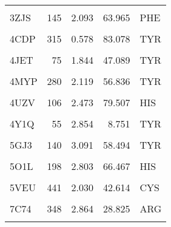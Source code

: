 \begin{table}
{\begin{tabular}{lrrrl}
				\cellcolor{gray!6}{3VP5} & \cellcolor{gray!6}{149} & \cellcolor{gray!6}{2.237} & \cellcolor{gray!6}{49.264} & \cellcolor{gray!6}{HIS}\\
				3ZJS & 145 & 2.093 & 63.965 & PHE\\
				\cellcolor{gray!6}{4B8N} & \cellcolor{gray!6}{71} & \cellcolor{gray!6}{1.755} & \cellcolor{gray!6}{70.933} & \cellcolor{gray!6}{HIS}\\
				4CDP & 315 & 0.578 & 83.078 & TYR\\
				\addlinespace
				\cellcolor{gray!6}{4I3Q} & \cellcolor{gray!6}{105} & \cellcolor{gray!6}{1.866} & \cellcolor{gray!6}{38.216} & \cellcolor{gray!6}{ARG}\\
				4JET & 75 & 1.844 & 47.089 & TYR\\
				\cellcolor{gray!6}{4MF9} & \cellcolor{gray!6}{331} & \cellcolor{gray!6}{1.736} & \cellcolor{gray!6}{79.914} & \cellcolor{gray!6}{PHE}\\
				4MYP & 280 & 2.119 & 56.836 & TYR\\
				\cellcolor{gray!6}{4NL5} & \cellcolor{gray!6}{55} & \cellcolor{gray!6}{2.707} & \cellcolor{gray!6}{25.915} & \cellcolor{gray!6}{THR}\\
				\addlinespace
				4UZV & 106 & 2.473 & 79.507 & HIS\\
				\cellcolor{gray!6}{4XZD} & \cellcolor{gray!6}{75} & \cellcolor{gray!6}{1.999} & \cellcolor{gray!6}{46.839} & \cellcolor{gray!6}{TYR}\\
				4Y1Q & 55 & 2.854 & 8.751 & TYR\\
				\cellcolor{gray!6}{5CN5} & \cellcolor{gray!6}{93} & \cellcolor{gray!6}{2.970} & \cellcolor{gray!6}{82.799} & \cellcolor{gray!6}{HIS}\\
				5GJ3 & 140 & 3.091 & 58.494 & TYR\\
				\addlinespace
				\cellcolor{gray!6}{5KZL} & \cellcolor{gray!6}{15} & \cellcolor{gray!6}{2.756} & \cellcolor{gray!6}{59.949} & \cellcolor{gray!6}{HIS}\\
				5O1L & 198 & 2.803 & 66.467 & HIS\\
				\cellcolor{gray!6}{5O1M} & \cellcolor{gray!6}{230} & \cellcolor{gray!6}{2.457} & \cellcolor{gray!6}{48.514} & \cellcolor{gray!6}{THR}\\
				5VEU & 441 & 2.030 & 42.614 & CYS\\
				\cellcolor{gray!6}{6A2J} & \cellcolor{gray!6}{278} & \cellcolor{gray!6}{2.230} & \cellcolor{gray!6}{63.931} & \cellcolor{gray!6}{HIS}\\
				\addlinespace
				7C74 & 348 & 2.864 & 28.825 & ARG\\
				\cellcolor{gray!6}{7DMR} & \cellcolor{gray!6}{354} & \cellcolor{gray!6}{2.321} & \cellcolor{gray!6}{48.490} & \cellcolor{gray!6}{VAL}\\
				\bottomrule
		\end{tabular}}
	\end{table}